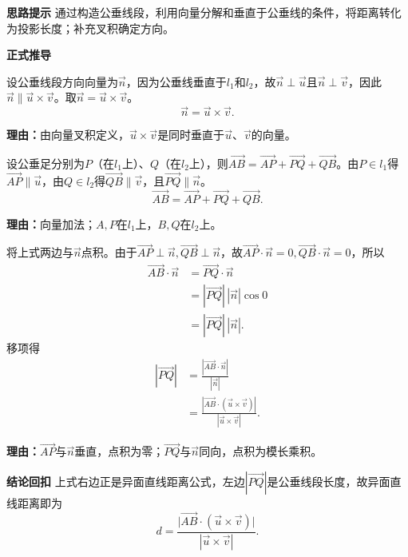 \begin{proofbox}
	\textbf{\textcolor{CProof}{思路提示}}
	通过构造公垂线段，利用向量分解和垂直于公垂线的条件，将距离转化为投影长度；补充叉积确定方向。

	\medskip
	\textbf{\textcolor{CProof}{正式推导}}
	\begin{description}[style=nextline, leftmargin=2.8em, labelsep=0.5em, itemsep=0.55em]
		\item[\textbf{步骤一（公垂线方向）：}] 设公垂线段方向向量为$\vec{n}$，因为公垂线垂直于$l_1$和$l_2$，故$\vec{n}\perp\vec{u}$且$\vec{n}\perp\vec{v}$，因此$\vec{n}\parallel\vec{u}\times\vec{v}$。取$\vec{n}=\vec{u}\times\vec{v}$。
			\[
				\vec{n} = \vec{u}\times\vec{v}.
			\]
			\par\textbf{理由：}由向量叉积定义，$\vec{u}\times\vec{v}$是同时垂直于$\vec{u}$、$\vec{v}$的向量。

		\item[\textbf{步骤二（向量分解）：}] 设公垂足分别为$P$（在$l_1$上）、$Q$（在$l_2$上），则$\overrightarrow{AB} = \overrightarrow{AP} + \overrightarrow{PQ} + \overrightarrow{QB}$。由$P\in l_1$得$\overrightarrow{AP}\parallel\vec{u}$，由$Q\in l_2$得$\overrightarrow{QB}\parallel\vec{v}$，且$\overrightarrow{PQ}\parallel\vec{n}$。
			\[
				\overrightarrow{AB} = \overrightarrow{AP} + \overrightarrow{PQ} + \overrightarrow{QB}.
			\]
			\par\textbf{理由：}向量加法；$A,P$在$l_1$上，$B,Q$在$l_2$上。

		\item[\textbf{步骤三（投影求距离）：}] 将上式两边与$\vec{n}$点积。由于$\overrightarrow{AP}\perp\vec{n},\overrightarrow{QB}\perp\vec{n}$，故$\overrightarrow{AP}\cdot\vec{n}=0,\overrightarrow{QB}\cdot\vec{n}=0$，所以
			\[
				\begin{aligned}
					\overrightarrow{AB}\cdot\vec{n} &= \overrightarrow{PQ}\cdot\vec{n} \\
					&= |\overrightarrow{PQ}|\,|\vec{n}|\cos 0 \\
					&= |\overrightarrow{PQ}|\,|\vec{n}|.
			\end{aligned}
			\]
			移项得
			\[
				\begin{aligned}
					|\overrightarrow{PQ}| &= \frac{|\overrightarrow{AB}\cdot\vec{n}|}{|\vec{n}|} \\
					&= \frac{|\overrightarrow{AB}\cdot(\vec{u}\times\vec{v})|}{|\vec{u}\times\vec{v}|}.
			\end{aligned}
			\]
			\par\textbf{理由：}$\overrightarrow{AP}$与$\vec{n}$垂直，点积为零；$\overrightarrow{PQ}$与$\vec{n}$同向，点积为模长乘积。
	\end{description}

	\medskip
	\textbf{\textcolor{CProof}{结论回扣}}
	上式右边正是异面直线距离公式，左边$|\overrightarrow{PQ}|$是公垂线段长度，故异面直线距离即为
	\[
		d = \frac{\bigl|\overrightarrow{AB}\cdot(\vec{u}\times\vec{v})\bigr|}{|\vec{u}\times\vec{v}|}.
	\]
\end{proofbox}
